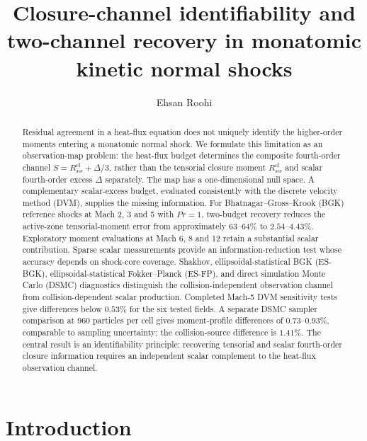 \documentclass[lineno,paper]{JFM-FLM_Au}
\title{Closure-channel identifiability and two-channel recovery in monatomic kinetic normal shocks}
\author{Ehsan Roohi\aff{1}}
\affiliation{\aff{1}Department of Mechanical and Industrial Engineering, University of Massachusetts Amherst, Amherst, MA 01003, USA}
\newenvironment{revision}{\begingroup\colorlet{shadecolor}{revisionyellow}\begin{shaded}}{\end{shaded}\endgroup}
\newenvironment{revision}{}{}
\newcommand{\cl}{\mathrm{cl}}
\begin{document}
\maketitle
\raggedbottom


\begin{abstract}
\begin{revision}
Residual agreement in a heat-flux equation does not uniquely identify the higher-order moments entering a monatomic normal shock. We formulate this limitation as an observation-map problem: the heat-flux budget determines the composite fourth-order channel $S=R^{\cl}_{xx}+\Delta/3$, rather than the tensorial closure moment $R^{\cl}_{xx}$ and scalar fourth-order excess $\Delta$ separately. The map has a one-dimensional null space. A complementary scalar-excess budget, evaluated consistently with the discrete velocity method (DVM), supplies the missing information. For Bhatnagar--Gross--Krook (BGK) reference shocks at Mach 2, 3 and 5 with $Pr=1$, two-budget recovery reduces the active-zone tensorial-moment error from approximately $63$--$64\%$ to $2.54$--$4.43\%$. Exploratory moment evaluations at Mach 6, 8 and 12 retain a substantial scalar contribution. Sparse scalar measurements provide an information-reduction test whose accuracy depends on shock-core coverage. Shakhov, ellipsoidal-statistical BGK (ES-BGK), ellipsoidal-statistical Fokker--Planck (ES-FP), and direct simulation Monte Carlo (DSMC) diagnostics distinguish the collision-independent observation channel from collision-dependent scalar production. Completed Mach-5 DVM sensitivity tests give differences below $0.53\%$ for the six tested fields. A separate DSMC sampler comparison at 960 particles per cell gives moment-profile differences of $0.73$--$0.93\%$, comparable to sampling uncertainty; the collision-source difference is $1.41\%$. The central result is an identifiability principle: recovering tensorial and scalar fourth-order closure information requires an independent scalar complement to the heat-flux observation channel.
\end{revision}
\end{abstract}

\section{Introduction}
\label{sec:introduction}
\end{document}
